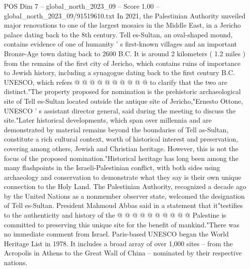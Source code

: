 \begin{textsample}{POS Dim 7 – global\_north\_2023\_09 – Score 1.00 – global\_north\_2023\_09/91519610.txt}
In 2021, the Palestinian Authority unveiled major renovations to one of the largest mosaics in the Middle East, in a Jericho palace dating back to the 8th century.
Tell es-Sultan, an oval-shaped mound, contains evidence of one of humanity ' s first-known villages and an important Bronze-Age town dating back to 2600 B.C.
It is around 2 kilometers ( 1.2 miles ) from the remains of the first city of Jericho, which contains ruins of importance to Jewish history, including a synagogue dating back to the first century B.C.
UNESCO, which refers @ @ @ @ @ @ @ @ @ @ to clarify that the two are distinct."The property proposed for nomination is the prehistoric archaeological site of Tell es-Sultan located outside the antique site of Jericho,"Ernesto Ottone, UNESCO ' s assistant director general, said during the meeting to discuss the site."Later historical developments, which span over millennia and are demonstrated by material remains beyond the boundaries of Tell as-Sultan, constitute a rich cultural context, worth of historical interest and preservation, covering among others, Jewish and Christian heritage.
However, this is not the focus of the proposed nomination."Historical heritage has long been among the many flashpoints in the Israeli-Palestinian conflict, with both sides using archaeology and conservation to demonstrate what they say is their own unique connection to the Holy Land.
The Palestinian Authority, recognized a decade ago by the United Nations as a nonmember observer state, welcomed the designation of Tell es-Sultan.
President Mahmoud Abbas said in a statement that it"testifies to the authenticity and history of the @ @ @ @ @ @ @ @ @ @ Palestine is committed to preserving this unique site for the benefit of mankind."There was no immediate comment from Israel.
Paris-based UNESCO began the World Heritage List in 1978.
It includes a broad array of over 1,000 sites -- from the Acropolis in Athens to the Great Wall of China -- nominated by their respective nations.

\end{textsample}
